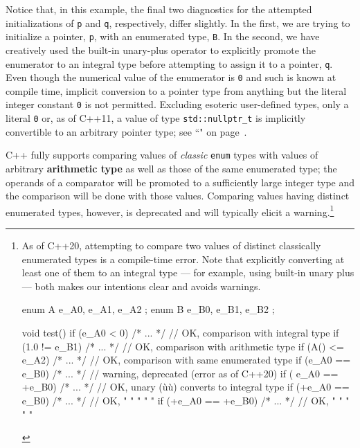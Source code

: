 \noindent Notice that, in this example, the final two diagnostics for the
attempted initializations of \texttt{p} and \texttt{q}, respectively,
differ slightly. In the first, we are trying to initialize a pointer,
\texttt{p}, with an enumerated type, \texttt{B}. In the second, we have
creatively used the built-in unary-plus operator to explicitly promote
the enumerator to an integral type before attempting to assign it to a
pointer, \texttt{q}. Even though the numerical value of the enumerator
is \texttt{0} and such is known at compile time, implicit
conversion to a pointer type from anything but the literal integer
constant \texttt{0} is not
permitted. Excluding esoteric user-defined
types, only a literal \texttt{0} or, as of C++11, a value of type
\texttt{std::nullptr\_t} is implicitly convertible to an arbitrary
  pointer type; see ``" on page~\pageref{null-pointer-literal-(nullptr)}.

C++ fully supports comparing values of \emph{classic} \texttt{enum}
types with values of arbitrary \textbf{arithmetic type} as well as those
of the same enumerated type; the operands of a comparator will be
promoted to a sufficiently large integer type and the comparison will be
done with those values. Comparing values having distinct enumerated
types, however, is deprecated and will typically elicit a
warning.{\cprotect\footnote{As of C++20, attempting to compare two values of distinct classically enumerated
types is a compile-time error. Note that explicitly converting at least one of them to an
integral type --- for example, using built-in unary plus --- both
makes our intentions clear and avoids warnings.

\begin{emcppshiddenlisting}[emcppsbatch=e2]
    enum A { e_A0, e_A1, e_A2 };
    enum B { e_B0, e_B1, e_B2 };
\end{emcppshiddenlisting}
\begin{emcppslisting}[emcppsbatch=e2,basicstyle={\ttfamily\footnotesize}]
void test()
{
  if (e_A0 < 0)       { /* ... */ }  // OK, comparison with integral type
  if (1.0 != e_B1)    { /* ... */ }  // OK, comparison with arithmetic type
  if (A() <= e_A2)    { /* ... */ }  // OK, comparison with same enumerated type
  if (e_A0 == e_B0)   { /* ... */ }  // warning, deprecated (error as of C++20)
  if ( e_A0 == +e_B0) { /* ... */ }  // OK, unary (ù{\codeincomments{+}}ù) converts to integral type
  if (+e_A0 ==  e_B0) { /* ... */ }  // OK,   "        "     "     "      "
  if (+e_A0 == +e_B0) { /* ... */ }  // OK,   "        "     "     "      "
}
\end{emcppslisting}
      }}

